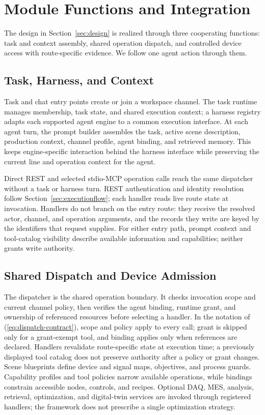 \section{Module Functions and Integration}
\label{sec:modules}
The design in Section~\ref{sec:design} is realized through three cooperating functions:
task and context assembly, shared operation dispatch, and controlled device
access with route-specific evidence. We follow one agent action through them.

\subsection{Task, Harness, and Context}
Task and chat entry points create or join a workspace channel. The task
runtime manages membership, task state, and shared execution context; a
harness registry adapts each supported agent engine to a common execution
interface. At each agent turn, the prompt builder assembles the task, active
scene description, production context, channel profile, agent binding, and
retrieved memory. This keeps engine-specific interaction behind the harness
interface while preserving the current line and operation context for the
agent.

Direct REST and selected stdio-MCP operation calls reach the same dispatcher
without a task or harness turn. REST authentication and identity resolution
follow Section~\ref{sec:executionflow}; each handler reads live route state
at invocation. Handlers do not branch on the entry route: they receive the
resolved actor, channel, and operation arguments, and the records they write
are keyed by the identifiers that request supplies. For either entry path,
prompt context and tool-catalog visibility describe available information and
capabilities; neither grants write authority.

\subsection{Shared Dispatch and Device Admission}
\label{sec:governed}
The dispatcher is the shared operation boundary. It checks invocation scope
and current channel policy, then verifies the agent binding, runtime grant,
and ownership of referenced resources before selecting a handler. In the
notation of (\ref{eq:dispatch-contract}), scope and policy apply to every
call; grant is skipped only for a grant-exempt tool, and binding applies only
when references are declared. Handlers
revalidate route-specific state at execution time; a previously displayed
tool catalog does not preserve authority after a policy or grant changes.
Scene blueprints define device and signal maps, objectives, and process
guards. Capability profiles and tool policies narrow available operations,
while bindings constrain accessible nodes, controls, and recipes. Optional
DAQ, MES, analysis, retrieval, optimization, and digital-twin services are
invoked through registered handlers; the framework does not prescribe a
single optimization strategy.

